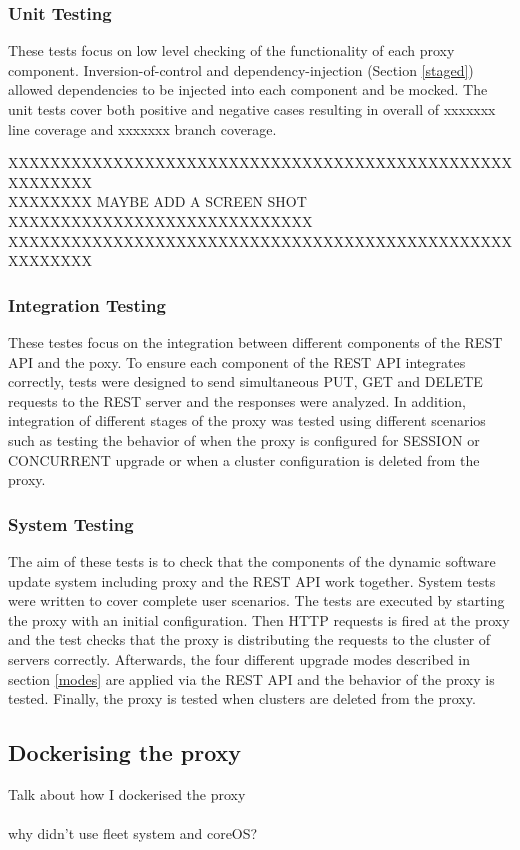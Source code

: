 \documentclass[a4paper,11pt,twoside]{article}
\begin{document}
\subsubsection{Unit Testing}
These tests focus on low level checking of the functionality of each proxy component. Inversion-of-control and dependency-injection (Section \ref{staged}) allowed dependencies to be injected into each component and be mocked. The unit tests cover both positive and negative cases resulting in overall of xxxxxxx line coverage and xxxxxxx branch coverage.    

XXXXXXXXXXXXXXXXXXXXXXXXXXXXXXXXXXXXXXXXXXXXXXXXXXXXXXXX\\
XXXXXXXX MAYBE ADD A SCREEN SHOT XXXXXXXXXXXXXXXXXXXXXXXXXXXXX\\
XXXXXXXXXXXXXXXXXXXXXXXXXXXXXXXXXXXXXXXXXXXXXXXXXXXXXXXX\\ 


\subsubsection{Integration Testing}
These testes focus on the integration between different components of the REST API and the poxy. To ensure each component of the REST API integrates correctly, tests were designed to send simultaneous PUT, GET and DELETE requests to the REST server and the responses were analyzed. In addition, integration of different stages of the proxy was tested using different scenarios such as testing the behavior of when the proxy is configured for SESSION or CONCURRENT upgrade or when a cluster configuration is deleted from the proxy.

\subsubsection{System Testing}
The aim of these tests is to check that the components of the dynamic software update system including proxy and the REST API work together. System tests were written to cover complete user scenarios. The tests are executed by starting the proxy with an initial configuration. Then HTTP requests is fired at the proxy and the test checks that the proxy is distributing the requests to the cluster of servers correctly. Afterwards, the four different upgrade modes described in section \ref{modes} are applied via the REST API and the behavior of the  proxy is tested. Finally, the proxy is tested when clusters are deleted from the proxy.   

\subsection{Dockerising the proxy}
Talk about how I dockerised the proxy\\\\
why didn't use fleet system and coreOS? \\\\
\end{document}
